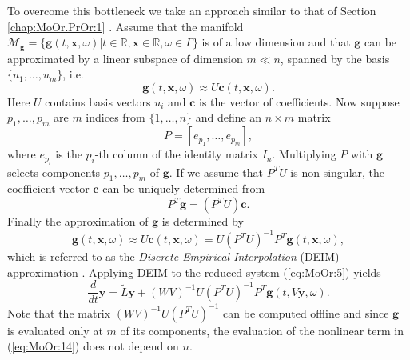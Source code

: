 \documentclass[final]{siamart}
\begin{document}
{{\color{black}} To overcome this bottleneck we take an approach similar to that of Section \ref{chap:MoOr.PrOr:1} \cite{Chaturantabut:2010cz,Barrault:2004kz}}. Assume that the manifold $\mathcal M_{\mathbf g} = \{ \mathbf g(t,\mathbf x , \omega)| t\in \mathbb R, \mathbf x \in \mathbb R , \omega \in \Gamma\}$ is of a low dimension and that $\mathbf g$ can be approximated by a linear subspace of dimension $m\ll n$, spanned by the basis $\{ u_1 , \dots , u_m \}$, i.e.
\begin{equation} \label{eq:MoOr:10}
	\mathbf g(t,\mathbf x,\omega) \approx U \mathbf c(t,\mathbf x,\omega).
\end{equation}
Here $U$ contains basis vectors $u_i$ and $\mathbf c$ is the vector of coefficients. Now suppose $p_1,\dots,p_m$ are $m$ indices from $\{1,\dots,n\}$ and define an $n\times m$ matrix
\begin{equation} \label{eq:MoOr:11}
	P = [e_{p_1},\dots,e_{p_m}],
\end{equation}
where $e_{p_i}$ is the $p_i$-th column of the identity matrix $I_n$. Multiplying $P$ with $\mathbf g$ selects components $p_1,\dots,p_m$ of $\mathbf g$. If we assume that $P^TU$ is non-singular, the coefficient vector $\mathbf c$ can be uniquely determined from
\begin{equation} \label{eq:MoOr:12}
	P^T \mathbf g = (P^TU)\mathbf c.
\end{equation}
Finally the approximation of $\mathbf g$ is determined by
\begin{equation} \label{eq:MoOr:13}
	\mathbf g(t,\mathbf x,\omega) \approx U \mathbf c(t,\mathbf x,\omega) = U (P^TU)^{-1} P^T \mathbf g(t,\mathbf x,\omega),
\end{equation}
which is referred to as the \emph{Discrete Empirical Interpolation} (DEIM) approximation \cite{Chaturantabut:2010cz}. Applying DEIM to the reduced system (\ref{eq:MoOr:5}) yields
\begin{equation} \label{eq:MoOr:14}
	\frac{d}{dt} \mathbf y = \tilde L \mathbf y + (WV)^{-1} U(P^TU)^{-1}P^T \mathbf g(t,V\mathbf y , \omega).
\end{equation}
Note that the matrix $(WV)^{-1} U(P^TU)^{-1}$ can be computed offline and since $\mathbf g$ is evaluated only at $m$ of its components, the evaluation of the nonlinear term in (\ref{eq:MoOr:14}) does not depend on $n$.
\end{document}
